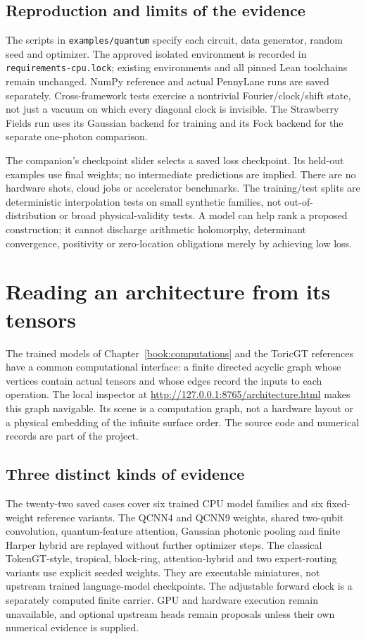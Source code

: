 \documentclass[11pt,oneside,openany]{book}
\theoremstyle{definition}\newtheorem{definition}[theorem]{Definition}
\theoremstyle{remark}\newtheorem{remark}[theorem]{Remark}
\begin{document}
\section{Reproduction and limits of the evidence}
The scripts in \texttt{examples/quantum} specify each circuit, data generator, random seed and optimizer. The approved isolated environment is recorded in \texttt{requirements-cpu.lock}; existing environments and all pinned Lean toolchains remain unchanged. NumPy reference and actual PennyLane runs are saved separately. Cross-framework tests exercise a nontrivial Fourier/clock/shift state, not just a vacuum on which every diagonal clock is invisible. The Strawberry Fields run uses its Gaussian backend for training and its Fock backend for the separate one-photon comparison.

The companion's checkpoint slider selects a saved loss checkpoint. Its held-out examples use final weights; no intermediate predictions are implied. There are no hardware shots, cloud jobs or accelerator benchmarks. The training/test splits are deterministic interpolation tests on small synthetic families, not out-of-distribution or broad physical-validity tests. A model can help rank a proposed construction; it cannot discharge arithmetic holomorphy, determinant convergence, positivity or zero-location obligations merely by achieving low loss.

\chapter{Reading an architecture from its tensors}
\label{book:architecture}
The trained models of Chapter~\ref{book:computations} and the ToricGT
references have a common computational interface: a finite directed acyclic
graph whose vertices contain actual tensors and whose edges record the
inputs to each operation. The local inspector at
\url{http://127.0.0.1:8765/architecture.html} makes this graph navigable.
Its scene is a computation graph, not a hardware layout or a physical
embedding of the infinite surface order. The source code and numerical
records are part of the project.

\section{Three distinct kinds of evidence}
The twenty-two saved cases cover six trained CPU model families and six
fixed-weight reference variants. The QCNN4 and QCNN9 weights, shared
two-qubit convolution, quantum-feature attention, Gaussian photonic pooling
and finite Harper hybrid are replayed without further optimizer steps.
The classical TokenGT-style, tropical, block-ring, attention-hybrid and two
expert-routing variants use explicit seeded weights. They are executable
miniatures, not upstream trained language-model checkpoints. The adjustable
forward clock is a separately computed finite carrier. GPU and hardware
execution remain unavailable, and optional upstream heads remain proposals
unless their own numerical evidence is supplied.
\end{document}
